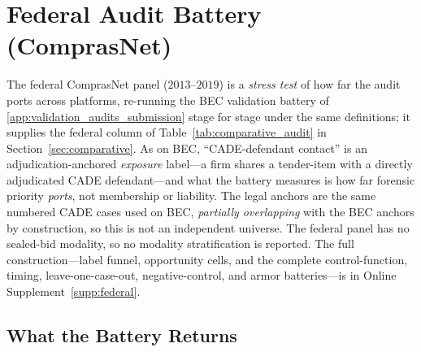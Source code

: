 
\section{Federal Audit Battery (ComprasNet)}
\label{app:federal_audit_submission}

The federal ComprasNet panel ($2013$--$2019$) is a \emph{stress test} of
how far the audit ports across platforms, re-running the BEC validation
battery of \ref{app:validation_audits_submission} stage for stage under the
same definitions; it supplies the federal column of
Table~\ref{tab:comparative_audit} in Section~\ref{sec:comparative}. As on
BEC, ``CADE-defendant contact'' is an adjudication-anchored \emph{exposure}
label---a firm shares a tender-item with a directly adjudicated CADE
defendant---and what the battery measures is how far forensic priority
\emph{ports}, not membership or liability. The legal anchors are the same
numbered CADE cases used on BEC, \emph{partially overlapping} with the BEC
anchors by construction, so this is not an independent universe. The
federal panel has no sealed-bid modality, so no modality stratification is
reported. The full construction---label funnel, opportunity cells, and the
complete control-function, timing, leave-one-case-out, negative-control,
and armor batteries---is in Online Supplement~\ref{supp:federal}.

\subsection{What the Battery Returns}
\label{app:federal_summary}

